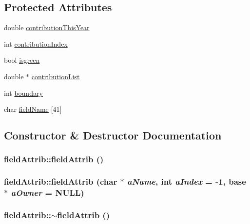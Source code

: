 \subsection*{Protected Attributes}
\begin{DoxyCompactItemize}
\item 
double \hyperlink{classfield_attrib_ada4309ce9c7a4a43949c7328ea354ae3}{contributionThisYear}
\item 
int \hyperlink{classfield_attrib_a909ac2a6b94cdd368eaec3f7566bb7b9}{contributionIndex}
\item 
bool \hyperlink{classfield_attrib_a135b7abba9c0136841f04ac3e65321fb}{isgreen}
\item 
double $\ast$ \hyperlink{classfield_attrib_a5695522ff0682c44537291de38b2a77f}{contributionList}
\item 
int \hyperlink{classfield_attrib_ac05bf2db94fc9d2314d56545d08d1a76}{boundary}
\item 
char \hyperlink{classfield_attrib_a24ece0b54d20913e88bcdb5c0a7bb35d}{fieldName} \mbox{[}41\mbox{]}
\end{DoxyCompactItemize}


\subsection{Constructor \& Destructor Documentation}
\hypertarget{classfield_attrib_aa749f89cc6d6dbe3fac906600bfc3aac}{
\subsubsection[{fieldAttrib}]{\setlength{\rightskip}{0pt plus 5cm}fieldAttrib::fieldAttrib ()}}
\label{classfield_attrib_aa749f89cc6d6dbe3fac906600bfc3aac}
\hypertarget{classfield_attrib_a53985e7c789cb2e0ef6688115d6ffd21}{
\subsubsection[{fieldAttrib}]{\setlength{\rightskip}{0pt plus 5cm}fieldAttrib::fieldAttrib (char $\ast$ {\em aName}, \/  int {\em aIndex} = {\ttfamily -\/1}, \/  {\bf base} $\ast$ {\em aOwner} = {\ttfamily NULL})}}
\label{classfield_attrib_a53985e7c789cb2e0ef6688115d6ffd21}
\hypertarget{classfield_attrib_a1f87a4e6d877167b1638b5975612da96}{
\subsubsection[{$\sim$fieldAttrib}]{\setlength{\rightskip}{0pt plus 5cm}fieldAttrib::$\sim$fieldAttrib ()}}
\label{classfield_attrib_a1f87a4e6d877167b1638b5975612da96}


